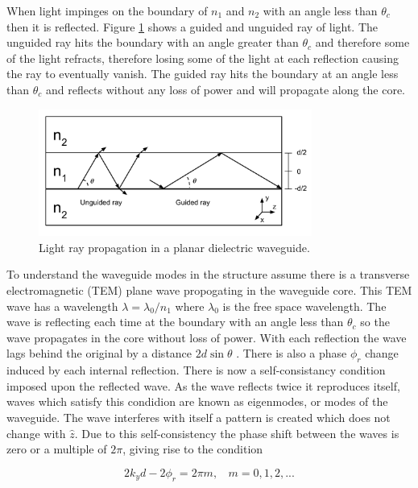 When light impinges on the boundary of $n_1$ and $n_2$ with an angle less than
$\theta_c$ then it is reflected. Figure \ref{fig:planar_reflection} shows a
guided and unguided ray of light. The unguided ray hits the boundary with an
angle greater than $\theta_c$ and therefore some of the light refracts,
therefore losing some of the light at each reflection causing the ray to
eventually vanish. The guided ray hits the boundary at an angle less than
$\theta_c$ and reflects without any loss of power and will propagate along the
core.

\begin{figure}[h!] \begin{center}
\includegraphics[width=0.8\textwidth]{images/thesis_planar_reflection.pdf}
\end{center} \caption{Light ray propagation in a planar dielectric waveguide.}
\label{fig:planar_reflection} \end{figure}

To understand the waveguide modes in the structure assume there is a transverse
electromagnetic (TEM) plane wave propogating in the waveguide core. This TEM
wave has a wavelength $\lambda = \lambda_0/n_1$ where $\lambda_0$ is the free
space wavelength. The wave is reflecting each time at the boundary with an angle
less than $\theta_c$ so the wave propagates in the core without loss of power.
With each reflection the wave lags behind the original by a distance
$2d\sin{\theta}$ \cite{saleh1991fundamentals}. There is also a phase $\phi_r$
change induced by each internal reflection. There is now a self-consistancy
condition imposed upon the reflected wave. As the wave reflects twice it
reproduces itself, waves which satisfy this condidion are known as eigenmodes,
or modes of the waveguide. The wave interferes with itself a pattern is created
which does not change with $\hat{z}$. Due to this self-consistency the phase
shift between the waves is zero or a multiple of $2\pi$, giving rise to the
condition

\begin{equation}\label{eqn:mode_eqn} 2 k_y d - 2 \phi_r = 2\pi m, \ \ \ \ m =
\mathrm{0, 1, 2,...} \end{equation}


